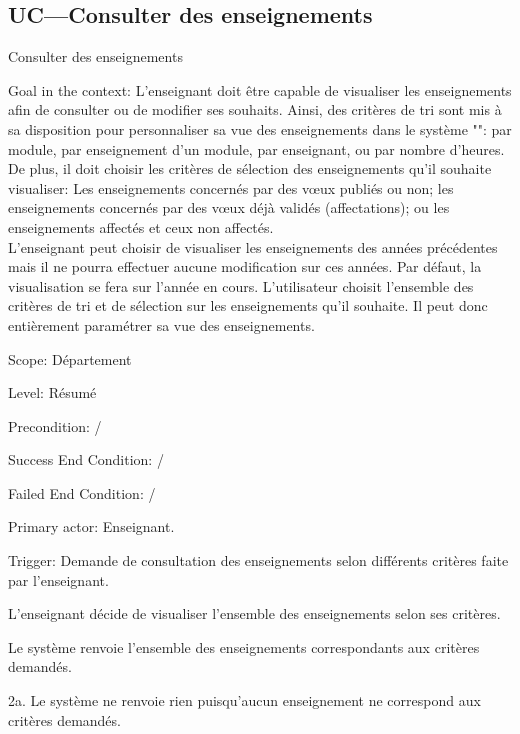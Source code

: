  \subsection{UC---Consulter des enseignements}

\begin{usecase}{Consulter des enseignements}
\label{usecase:consulter}
\begin{information}
	\item[Goal in the context:]  L'enseignant doit être capable de visualiser les enseignements afin de consulter ou de modifier ses souhaits.
 Ainsi, des critères de tri sont mis à sa disposition pour personnaliser sa vue des enseignements dans le système "\projet": par module, par enseignement d'un module, par enseignant, ou par nombre d'heures.\\
 De plus, il doit choisir les critères de sélection des enseignements qu'il souhaite visualiser:
Les enseignements concernés par des vœux publiés ou non; les enseignements concernés par des vœux déjà validés (affectations);
ou les enseignements affectés et ceux non affectés.\\
 L'enseignant peut choisir de visualiser les enseignements des années précédentes mais il ne pourra effectuer aucune modification sur ces années. Par défaut, la visualisation se fera sur l'année en cours.
 L'utilisateur choisit l'ensemble des critères de tri et de sélection sur les enseignements qu'il souhaite. Il peut donc entièrement paramétrer sa vue des enseignements.
	\item[Scope:] Département
	\item[Level:] Résumé
	\item[Precondition:]/
	\item[Success End Condition:]/
	\item[Failed End Condition:]/
	\item[Primary actor:] Enseignant.
	\item[Trigger:] Demande de consultation des enseignements selon différents critères faite par l'enseignant.
\end{information}

\begin{scenario}
	\item L'enseignant décide de visualiser l'ensemble des enseignements selon ses critères.
	\item Le système renvoie l'ensemble des enseignements correspondants aux critères demandés.
\end{scenario}

 \begin{extension}
 \item [2a.] Le système ne renvoie rien puisqu'aucun enseignement ne correspond aux critères demandés.
 \end{extension}
\end{usecase}


